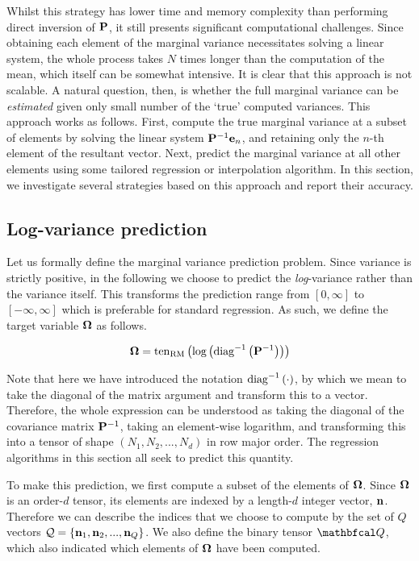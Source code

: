 Whilst this strategy has lower time and memory complexity than performing direct inversion of $\mathbf{P}$, it still presents significant computational challenges. Since obtaining each element of the marginal variance necessitates solving a linear system, the whole process takes $N$ times longer than the computation of the mean, which itself can be somewhat intensive. It is clear that this approach is not scalable. A natural question, then, is whether the full marginal variance can be \textit{estimated} given only small number of the `true' computed variances.  This approach works as follows. First, compute the true marginal variance at a subset of elements by solving the linear system $\mathbf{P}^{-1}\mathbf{e}_n$, and retaining only the $n$-th element of the resultant vector. Next, predict the marginal variance at all other elements using some tailored regression or interpolation algorithm. In this section, we investigate several strategies based on this approach and report their accuracy. 


\subsection{Log-variance prediction}

Let us formally define the marginal variance prediction problem. Since variance is strictly positive, in the following we choose to predict the \textit{log}-variance rather than the variance itself. This transforms the prediction range from $[0, \infty]$ to $[-\infty, \infty]$ which is preferable for standard regression. As such, we define the target variable $\mathbf{\Omega}$ as follows. 

\begin{equation}
    \mathbf{\Omega} = \text{\textup{ten}}_{\text{\textup{RM}}}\left(\text{log}\left(\text{\textup{diag}}^{-1}\left(\mathbf{P}^{-1}\right)\right)\right)
\end{equation}

Note that here we have introduced the notation $\text{\textup{diag}}^{-1}\left(\cdot\right)$, by which we mean to take the diagonal of the matrix argument and transform this to a vector. Therefore, the whole expression can be understood as taking the diagonal of the covariance matrix $\mathbf{P}^{-1}$, taking an element-wise logarithm, and transforming this into a tensor of shape $(N_1, N_2, ..., N_d)$ in row major order. The regression algorithms in this section all seek to predict this quantity. 

To make this prediction, we first compute a subset of the elements of $\mathbf{\Omega}$. Since $\mathbf{\Omega}$ is an order-$d$ tensor, its elements are indexed by a length-$d$ integer vector, $\mathbf{n}$. Therefore we can describe the indices that we choose to compute by the set of $Q$ vectors $\mathcal{Q} = \{\mathbf{n}_1, \mathbf{n}_2, ..., \mathbf{n}_Q \}$. We also define the binary tensor $\Qt$, which also indicated which elements of $\mathbf{\Omega}$ have been computed. 

